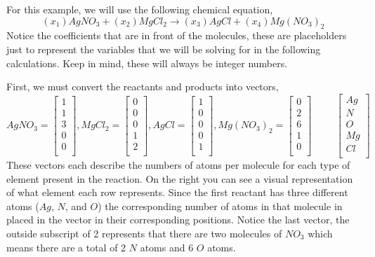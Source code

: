 \documentclass[10pt]{article}
\begin{document}
For this example, we will use the following chemical equation,
\[
(x_{1})AgNO_{3} + (x_{2})MgCl_{2} \to (x_{3})AgCl + (x_{4})Mg(NO_{3})_{2}
\]
Notice the coefficients that are in front of the molecules, these are placeholders just to represent the variables that
we will be solving for in the following calculations. Keep in mind, these will always be integer numbers. \\
\hfill

First, we must convert the reactants and products into vectors,
\[
AgNO_{3} = \left[ \begin{array}{c} 1 \\ 1 \\ 3 \\ 0 \\ 0 \\ \end{array} \right], 
MgCl_{2} = \left[ \begin{array}{c} 0 \\ 0 \\ 0 \\ 1 \\ 2 \\ \end{array} \right],
AgCl = \left[ \begin{array}{c} 1 \\ 0 \\ 0 \\ 0 \\ 1 \\ \end{array} \right],
Mg(NO_{3})_{2} = \left[ \begin{array}{c} 0 \\ 2 \\ 6 \\ 1 \\ 0 \\ \end{array} \right]
\hspace{1cm} \left[ \begin{array}{c} Ag \\ N \\ O \\ Mg \\ Cl \\ \end{array} \right]
\]
These vectors each describe the numbers of atoms per molecule for each type of element present in the reaction. On the right
you can see a visual representation of what element each row represents. Since the first reactant has three different atoms
($Ag$, $N$, and $O$) the corresponding number of atoms in that molecule in placed in the vector in their corresponding
positions. Notice the last vector, the outside subscript of 2 represents that there are two molecules of $NO_{3}$ which means
there are a total of 2 $N$ atoms and 6 $O$ atoms.
\end{document}
